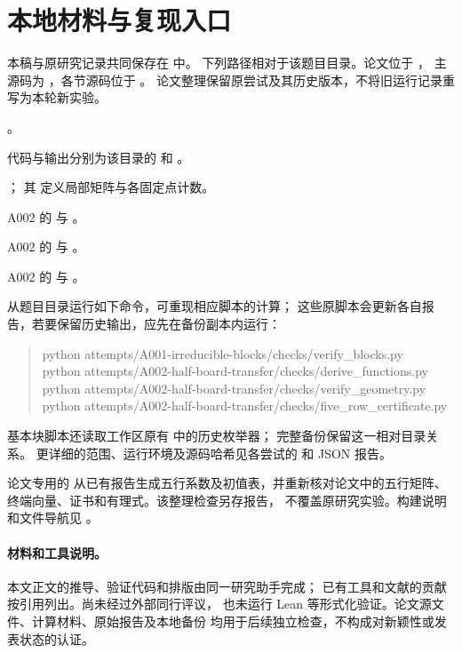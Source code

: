 \section{本地材料与复现入口}\label{app:repro}

本稿与原研究记录共同保存在
 中。
下列路径相对于该题目目录。论文位于 ，
主源码为 ，各节源码位于 。
论文整理保留原尝试及其历史版本，不将旧运行记录重写为本轮新实验。

\begin{description}[style=nextline,leftmargin=2em]
\item[基本块证明与几何核验]
。\par
代码与输出分别为该目录的 
和 。
\item[半棋盘证明与整数转移模型]
；
其  定义局部矩阵与各固定点计数。
\item[完整矩阵的精确表达式]
A002 的  与
。
\item[新的格点枚举与半棋盘重建]
A002 的  与
。
\item[六维代数证书]
A002 的  与
。
\end{description}

从题目目录运行如下命令，可重现相应脚本的计算；
这些原脚本会更新各自报告，若要保留历史输出，应先在备份副本内运行：
\begin{quote}\small\ttfamily
python attempts/A001-irreducible-blocks/checks/verify\_blocks.py\\
python attempts/A002-half-board-transfer/checks/derive\_functions.py\\
python attempts/A002-half-board-transfer/checks/verify\_geometry.py\\
python attempts/A002-half-board-transfer/checks/five\_row\_certificate.py
\end{quote}
基本块脚本还读取工作区原有
 中的历史枚举器；
完整备份保留这一相对目录关系。
更详细的范围、运行环境及源码哈希见各尝试的  和 JSON 报告。

论文专用的 
从已有报告生成五行系数及初值表，并重新核对论文中的五行矩阵、
终端向量、证书和有理式。该整理检查另存报告，
不覆盖原研究实验。构建说明和文件导航见 。

\paragraph{材料和工具说明。}
本文正文的推导、验证代码和排版由同一研究助手完成；
已有工具和文献的贡献按引用列出。尚未经过外部同行评议，
也未运行 Lean 等形式化验证。论文源文件、计算材料、原始报告及本地备份
均用于后续独立检查，不构成对新颖性或发表状态的认证。
